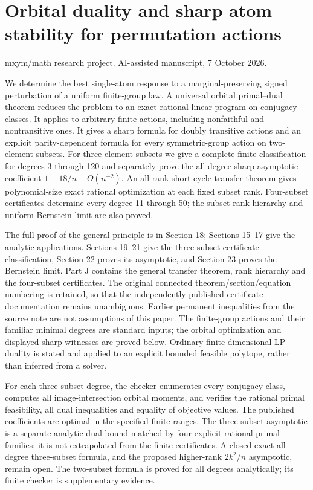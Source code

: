 \documentclass[
  11pt,
]{article}
\author{}
\date{}
\begin{document}
\section{Orbital duality and sharp atom stability for permutation
actions}\label{orbital-duality-and-sharp-atom-stability-for-permutation-actions}

mxym/math research project. AI-assisted manuscript, 7 October 2026.

We determine the best single-atom response to a marginal-preserving
signed perturbation of a uniform finite-group law. A universal orbital
primal--dual theorem reduces the problem to an exact rational linear
program on conjugacy classes. It applies to arbitrary finite actions,
including nonfaithful and nontransitive ones. It gives a sharp formula
for doubly transitive actions and an explicit parity-dependent formula
for every symmetric-group action on two-element subsets. For
three-element subsets we give a complete finite classification for
degrees 3 through 120 and separately prove the all-degree sharp
asymptotic coefficient \(1-18/n+O(n^{-2})\). An all-rank short-cycle
transfer theorem gives polynomial-size exact rational optimization at
each fixed subset rank. Four-subset certificates determine every degree
11 through 50; the subset-rank hierarchy and uniform Bernstein limit are
also proved.

The full proof of the general principle is in Section 18; Sections
15--17 give the analytic applications. Sections 19--21 give the
three-subset certificate classification, Section 22 proves its
asymptotic, and Section 23 proves the Bernstein limit. Part J contains
the general transfer theorem, rank hierarchy and the four-subset
certificates. The original connected theorem/section/equation numbering
is retained, so that the independently published certificate
documentation remains unambiguous. Earlier permanent inequalities from
the source note are not assumptions of this paper. The finite-group
actions and their familiar minimal degrees are standard inputs; the
orbital optimization and displayed sharp witnesses are proved below.
Ordinary finite-dimensional LP duality is stated and applied to an
explicit bounded feasible polytope, rather than inferred from a solver.

For each three-subset degree, the checker enumerates every conjugacy
class, computes all image-intersection orbital moments, and verifies the
rational primal feasibility, all dual inequalities and equality of
objective values. The published coefficients are optimal in the
specified finite ranges. The three-subset asymptotic is a separate
analytic dual bound matched by four explicit rational primal families;
it is not extrapolated from the finite certificates. A closed exact
all-degree three-subset formula, and the proposed higher-rank \(2k^2/n\)
asymptotic, remain open. The two-subset formula is proved for all
degrees analytically; its finite checker is supplementary evidence.
\end{document}
